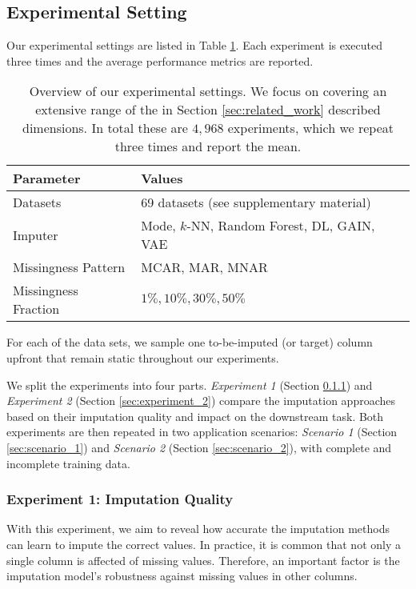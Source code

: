 \subsection{Experimental Setting}
%
Our experimental settings are listed in Table \ref{tab:experiment_settings}. Each experiment is executed three times and the average performance metrics are reported.
%
\begin{table}
	\centering
	\begin{tabular}{ll}
		\toprule
		Parameter            & Values                                     \\ \midrule
		Datasets             & 69 datasets (see supplementary material)    \\
		Imputer              & Mode, $k$-NN, Random Forest, DL, GAIN, VAE \\
		Missingness Pattern  & MCAR, MAR, MNAR                            \\
		Missingness Fraction & $1\%, 10\%, 30\%, 50\%$                      \\ \bottomrule
	\end{tabular}
	\caption{Overview of our experimental settings. We focus on covering an extensive range of the in Section \ref{sec:related_work} described dimensions. In total these are $4,968$ experiments, which we repeat three times and report the mean.}
	\label{tab:experiment_settings}
\end{table}
%
For each of the data sets, we sample one to-be-imputed (or target) column upfront that remain static throughout our experiments. 

We split the experiments into four parts. \emph{Experiment 1} (Section \ref{sec:experiment_1}) and \emph{Experiment 2} (Section \ref{sec:experiment_2}) compare the imputation approaches based on their imputation quality and impact on the downstream task. Both experiments are then repeated in two application scenarios: \emph{Scenario 1} (Section \ref{sec:scenario_1}) and \emph{Scenario 2} (Section \ref{sec:scenario_2}), with complete and incomplete training data.


\subsubsection{Experiment 1: Imputation Quality}
\label{sec:experiment_1}
%
With this experiment, we aim to reveal how accurate the imputation methods can learn to impute the correct values. In practice, it is common that not only a single column is affected of missing values. Therefore, an important factor is the imputation model's robustness against missing values in other columns.

